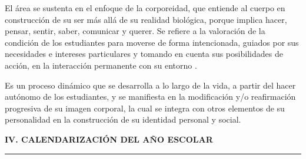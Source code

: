 \documentclass[11pt,a4paper]{article}
\begin{document}
\vspace{0.5em}
\begin{tcolorbox}[
    enhanced,
    colback=white,
    colframe=azultitulo,
    sharp corners=all,
    boxrule=0.4pt,
    left=8pt, right=8pt, top=6pt, bottom=6pt,
    borderline west={2pt}{0pt}{azultitulo},
    drop shadow southeast,
]
\justifying
El área se sustenta en el enfoque de la corporeidad, que entiende al cuerpo en construcción de su ser más allá de su realidad biológica, porque implica hacer, pensar, sentir, saber, comunicar y querer. Se refiere a la valoración de la condición de los estudiantes para moverse de forma intencionada, guiados por sus necesidades e intereses particulares y tomando en cuenta sus posibilidades de acción, en la interacción permanente con su entorno \parencite{barrow2018}.

Es un proceso dinámico que se desarrolla a lo largo de la vida, a partir del hacer autónomo de los estudiantes, y se manifiesta en la modificación y/o reafirmación progresiva de su imagen corporal, la cual se integra con otros elementos de su personalidad en la construcción de su identidad personal y social.
\end{tcolorbox}

\newpage

\vspace{1.5em}
\noindent
{\color{azultexto}\bfseries\Large IV. CALENDARIZACIÓN DEL AÑO ESCOLAR}\\[-0.3em]
{\color{azultexto}\rule{\textwidth}{0.6pt}}
\vspace{-1.8em}
\renewcommand{\arraystretch}{1.2}
\end{document}

